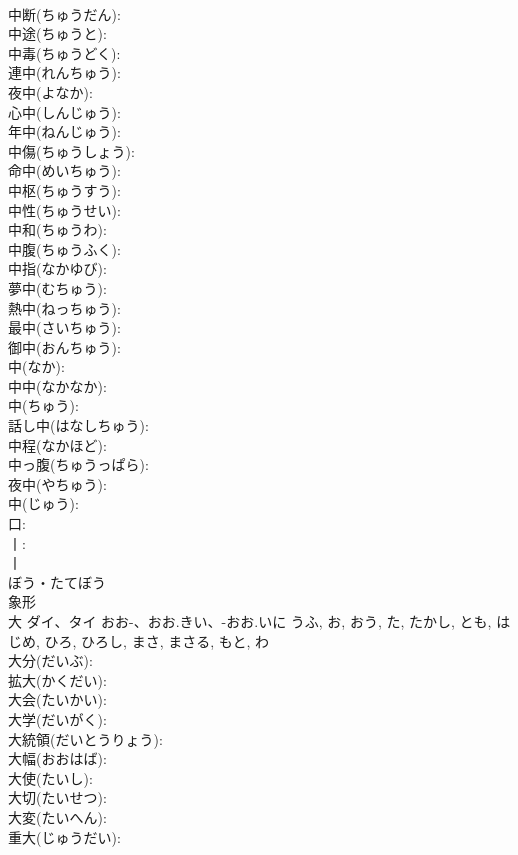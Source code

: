 \documentclass[8pt]{extreport}
\begin{document}
\begin{CJK}{UTF8}{min}
\\	中断(ちゅうだん): 
\\	中途(ちゅうと): 
\\	中毒(ちゅうどく): 
\\	連中(れんちゅう): 
\\	夜中(よなか): 
\\	心中(しんじゅう): 
\\	年中(ねんじゅう): 
\\	中傷(ちゅうしょう): 
\\	命中(めいちゅう): 
\\	中枢(ちゅうすう): 
\\	中性(ちゅうせい): 
\\	中和(ちゅうわ): 
\\	中腹(ちゅうふく): 
\\	中指(なかゆび): 
\\	夢中(むちゅう): 
\\	熱中(ねっちゅう): 
\\	最中(さいちゅう): 
\\	御中(おんちゅう): 
\\	中(なか): 
\\	中中(なかなか): 
\\	中(ちゅう): 
\\	話し中(はなしちゅう): 
\\	中程(なかほど): 
\\	中っ腹(ちゅうっぱら): 
\\	夜中(やちゅう): 
\\	中(じゅう): 
\\	口: 
\\	丨: 
\\	丨	
\\	ぼう・たてぼう	
\\	象形 
\\	大	ダイ、タイ	おお-、おお.きい、-おお.いに	うふ, お, おう, た, たかし, とも, はじめ, ひろ, ひろし, まさ, まさる, もと, わ	
\\	大分(だいぶ): 
\\	拡大(かくだい): 
\\	大会(たいかい): 
\\	大学(だいがく): 
\\	大統領(だいとうりょう): 
\\	大幅(おおはば): 
\\	大使(たいし): 
\\	大切(たいせつ): 
\\	大変(たいへん): 
\\	重大(じゅうだい): 

\end{CJK}
\end{document}
